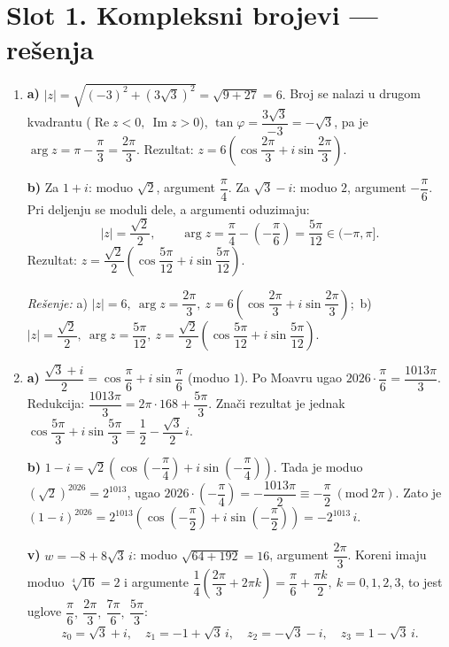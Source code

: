 


\section*{Slot 1. Kompleksni brojevi — rešenja}
\begin{enumerate}[label=\arabic*.]
\item \textbf{a)} $|z|=\sqrt{(-3)^2+(3\sqrt{3})^2}=\sqrt{9+27}=6.$ Broj se nalazi u drugom kvadrantu ($\operatorname{Re}z<0,\ \operatorname{Im}z>0$), $\tan\varphi=\dfrac{3\sqrt{3}}{-3}=-\sqrt{3}$, pa je $\arg z=\pi-\dfrac{\pi}{3}=\dfrac{2\pi}{3}.$ Rezultat: $z=6\left(\cos\dfrac{2\pi}{3}+i\sin\dfrac{2\pi}{3}\right).$

\textbf{b)} Za $1+i$: moduo $\sqrt{2}$, argument $\dfrac{\pi}{4}$. Za $\sqrt{3}-i$: moduo $2$, argument $-\dfrac{\pi}{6}$. Pri deljenju se moduli dele, a argumenti oduzimaju:
\[ |z|=\frac{\sqrt{2}}{2},\qquad \arg z=\frac{\pi}{4}-\left(-\frac{\pi}{6}\right)=\frac{5\pi}{12}\in(-\pi,\pi]. \]
Rezultat: $z=\dfrac{\sqrt{2}}{2}\left(\cos\dfrac{5\pi}{12}+i\sin\dfrac{5\pi}{12}\right).$

\textit{Rešenje:} a) $|z|=6,\ \arg z=\dfrac{2\pi}{3},\ z=6\left(\cos\dfrac{2\pi}{3}+i\sin\dfrac{2\pi}{3}\right)$;\ b) $|z|=\dfrac{\sqrt{2}}{2},\ \arg z=\dfrac{5\pi}{12},\ z=\dfrac{\sqrt{2}}{2}\left(\cos\dfrac{5\pi}{12}+i\sin\dfrac{5\pi}{12}\right).$

\item \textbf{a)} $\dfrac{\sqrt{3}+i}{2}=\cos\dfrac{\pi}{6}+i\sin\dfrac{\pi}{6}$ (moduo $1$). Po Moavru ugao $2026\cdot\dfrac{\pi}{6}=\dfrac{1013\pi}{3}.$ Redukcija: $\dfrac{1013\pi}{3}=2\pi\cdot168+\dfrac{5\pi}{3}.$ Znači rezultat je jednak $\cos\dfrac{5\pi}{3}+i\sin\dfrac{5\pi}{3}=\dfrac{1}{2}-\dfrac{\sqrt{3}}{2}\,i.$

\textbf{b)} $1-i=\sqrt{2}\left(\cos\left(-\dfrac{\pi}{4}\right)+i\sin\left(-\dfrac{\pi}{4}\right)\right).$ Tada je moduo $(\sqrt{2})^{2026}=2^{1013}$, ugao $2026\cdot\left(-\dfrac{\pi}{4}\right)=-\dfrac{1013\pi}{2}\equiv-\dfrac{\pi}{2}\ (\mathrm{mod}\ 2\pi).$ Zato je $(1-i)^{2026}=2^{1013}\left(\cos\left(-\dfrac{\pi}{2}\right)+i\sin\left(-\dfrac{\pi}{2}\right)\right)=-2^{1013}\,i.$

\textbf{v)} $w=-8+8\sqrt{3}\,i$: moduo $\sqrt{64+192}=16$, argument $\dfrac{2\pi}{3}$. Koreni imaju moduo $\sqrt[4]{16}=2$ i argumente $\dfrac{1}{4}\left(\dfrac{2\pi}{3}+2\pi k\right)=\dfrac{\pi}{6}+\dfrac{\pi k}{2},\ k=0,1,2,3$, to jest uglove $\dfrac{\pi}{6},\ \dfrac{2\pi}{3},\ \dfrac{7\pi}{6},\ \dfrac{5\pi}{3}$:
\[ z_0=\sqrt{3}+i,\quad z_1=-1+\sqrt{3}\,i,\quad z_2=-\sqrt{3}-i,\quad z_3=1-\sqrt{3}\,i. \]


\end{enumerate}
